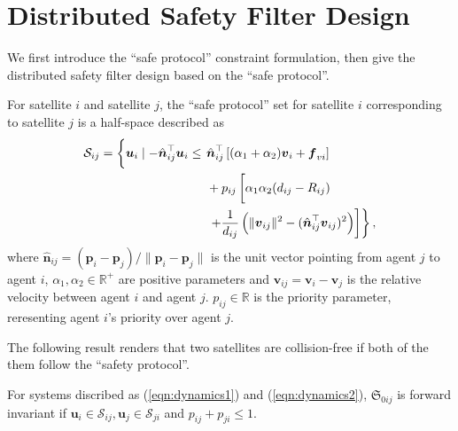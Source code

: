 \documentclass{ifacconf}
\begin{document}
\section{Distributed Safety Filter Design}\label{sec:filterDesign}
\par We first introduce the ``safe protocol'' constraint formulation, then give the distributed safety filter design based on the ``safe protocol''. 

\par For satellite $i$ and satellite $j$, the ``safe protocol'' set for satellite $i$ corresponding to satellite $j$ is a half-space described as
\begin{equation} \label{eqn:safeProtocol}
   \begin{aligned}
      \mathcal{S}_{ij} = \left\{ \boldsymbol{u}_i \mid -\hat{\boldsymbol{n}}_{ij}^\top \boldsymbol{u}_i \le \vphantom{\frac{1}{d_{ij}}} \right. 
      & \hat{\boldsymbol{n}}_{ij}^{\top} \left[(\alpha_1 + \alpha_2)\boldsymbol{v}_i + \boldsymbol{f}_{vi} \right] \\
      &+ p_{ij} \left[ \alpha_1 \alpha_2 (d_{ij} - R_{ij}) \vphantom{\frac{1}{d_{ij}}} \right. \\
      & \left. \left. + \frac{1}{d_{ij}}\left( \|\boldsymbol{v}_{ij}\|^2 - ( \hat{\boldsymbol{n}}_{ij}^{\top}\boldsymbol{v}_{ij} )^2 \right) \right] \right\},
   \end{aligned}
\end{equation}
where $\hat{\boldsymbol{n}}_{ij} = (\boldsymbol{p}_i - \boldsymbol{p}_j)/\| \boldsymbol{p}_i - \boldsymbol{p}_j \|$ is the unit vector pointing from agent $j$ to agent $i$, 
$\alpha_1, \alpha_2 \in \mathbb{R}^{+}$ are positive parameters and 
$\boldsymbol{v}_{ij} = \boldsymbol{v}_i - \boldsymbol{v}_j$ is the relative velocity between agent $i$ and agent $j$.
$p_{ij} \in \mathbb{R}$ is the priority parameter, reresenting agent $i$'s priority over agent $j$. 

\par The following result renders that two satellites are collision-free if both of the them follow the ``safety protocol''.

\begin{thm} \label{thm:safeProtocol}
   For systems discribed as (\ref{eqn:dynamics1}) and (\ref{eqn:dynamics2}), $\mathfrak{S}_{0ij}$ is forward invariant if $\boldsymbol{u}_i \in \mathcal{S}_{ij}, \boldsymbol{u}_j \in \mathcal{S}_{ji}$ and $p_{ij} + p_{ji} \le 1$.
\end{thm}
\end{document}
